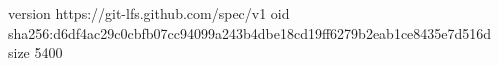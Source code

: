 version https://git-lfs.github.com/spec/v1
oid sha256:d6df4ac29c0cbfb07cc94099a243b4dbe18cd19ff6279b2eab1ce8435e7d516d
size 5400
